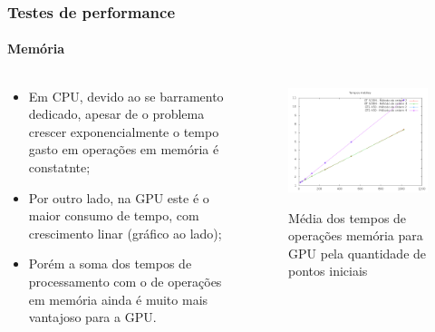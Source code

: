 \documentclass[brazil, 10pt]{beamer}
\begin{document}
\begin{frame}
  \frametitle{Testes de performance}
  \framesubtitle{Memória}
  
  \begin{columns}
    \begin{column}{.5\textwidth}
      \begin{itemize}
        \item Em CPU, devido ao se barramento dedicado, apesar de o problema crescer exponencialmente o tempo gasto em operações em memória é constatnte;
        \item Por outro lado, na GPU este é o maior consumo de tempo, com crescimento linar (gráfico ao lado);
        \item Porém a soma dos tempos de processamento com o de operações em memória ainda é muito mais vantajoso para a GPU.
      \end{itemize}
    \end{column}
    \begin{column}{.5\textwidth}
      \begin{figure}[!h]
        \begin{center}
          \includegraphics[width=1.1\textwidth, height=.7\textwidth]{img/gpu-memo-means-double.png}
          \label{fig:cpu-means}
          \caption{Média dos tempos de operações memória para GPU pela quantidade de pontos iniciais}
        \end{center}
      \end{figure}
    \end{column}
  \end{columns}

\end{frame}
\end{document}
